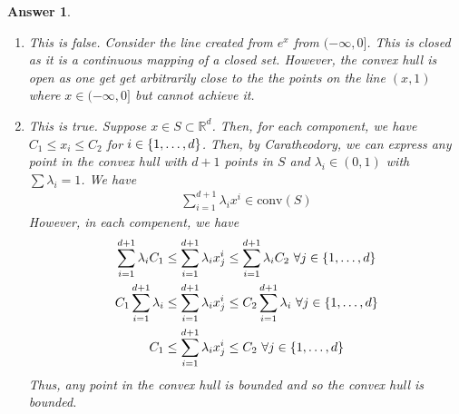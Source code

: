 \documentclass[12pt]{article}
\theoremstyle{colon}
\newtheorem*{answer}{Answer}
\begin{document}
\begin{answer}
  \leavevmode
  \begin{enumerate}[label=\roman*)]
    \item This is false. Consider the line created from $e^x$ from $(-\infty, 0]$. This is closed as it is a continuous mapping of a closed set. However, the convex hull is open as one get get arbitrarily close to the the points on the line $(x, 1)$ where $x \in (-\infty, 0]$ but cannot achieve it.
      \bigskip

    \item This is true. Suppose $x \in S \subset \mathbb{R}^d$. Then, for each component, we have $C_1 \leq x_i \leq C_2$ for $i \in \{1, \mathellipsis, d\}$. Then, by Caratheodory, we can express any point in the convex hull with $d+1$ points in $S$ and $\lambda_i \in (0,1)$ with $\sum \lambda_i = 1$. We have
      \begin{gather*}
        \sum_{i=1}^{d+1} \lambda_i x^i \in \text{conv}(S)
      \end{gather*}
      However, in each compenent, we have
      \begin{gather*}
        \sum_{i=1}^{d+1} \lambda_i C_1 \leq \sum_{i=1}^{d+1} \lambda_i x_j^i \leq \sum_{i=1}^{d+1} \lambda_i C_2 \ \forall j \in \{ 1, \mathellipsis, d \} \\
        C_1 \sum_{i=1}^{d+1} \lambda_i \leq \sum_{i=1}^{d+1} \lambda_i x_j^i \leq C_2 \sum_{i=1}^{d+1} \lambda_i \ \forall j \in \{ 1, \mathellipsis, d \} \\
        C_1 \leq \sum_{i=1}^{d+1} \lambda_i x_j^i \leq C_2 \ \forall j \in \{ 1, \mathellipsis, d \}
      \end{gather*}
      Thus, any point in the convex hull is bounded and so the convex hull is bounded.


\end{enumerate}
\end{answer}
\end{document}
